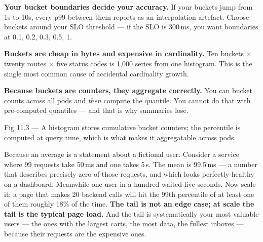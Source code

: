 \begin{wbitem}
  \item \textbf{Your bucket boundaries decide your accuracy.} If your buckets jump from 1s to 10s, every p99 between them reports as an interpolation artefact. Choose buckets around your SLO threshold --- if the SLO is 300\,ms, you want boundaries at 0.1, 0.2, 0.3, 0.5, 1.
  \item \textbf{Buckets are cheap in bytes and expensive in cardinality.} Ten buckets $\times$ twenty routes $\times$ five status codes is 1{,}000 series from one histogram. This is the single most common cause of accidental cardinality growth.
  \item \textbf{Because buckets are counters, they aggregate correctly.} You can  bucket counts across all pods and \emph{then} compute the quantile. You cannot do that with pre-computed quantiles --- and that is why summaries lose.
\end{wbitem}

\begin{wbfigure}{Fig 11.3 — A histogram stores cumulative bucket counters; the percentile is computed at query time, which is what makes it aggregatable across pods.}
\end{wbfigure}

 Because an average is a statement about a fictional user. Consider a service where 99 requests take 50\,ms and one takes 5\,s. The mean is 99.5\,ms --- a number that describes precisely zero of those requests, and which looks perfectly healthy on a dashboard. Meanwhile one user in a hundred waited five seconds. Now scale it: a page that makes 20 backend calls will hit the 99th percentile of at least one of them roughly 18\% of the time. \textbf{The tail is not an edge case; at scale the tail is the typical page load.} And the tail is systematically your most valuable users --- the ones with the largest carts, the most data, the fullest inboxes --- because their requests are the expensive ones.

